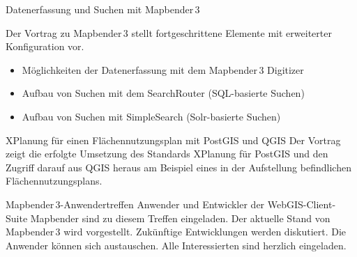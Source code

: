 %
{Datenerfassung und Suchen mit Mapbender\,3}%
{}%
{Der Vortrag zu Mapbender\,3 stellt fortgeschrittene Elemente mit erweiterter Konfiguration vor. 
\begin{itemize}
\RaggedRight
\setlength{\itemsep}{-2pt} %
 \item Möglichkeiten der Datenerfassung mit dem Mapbender\,3 Digitizer
 \item Aufbau von Suchen mit dem SearchRouter (SQL-basierte Suchen)
 \item Aufbau von Suchen mit SimpleSearch (Solr-basierte Suchen)
\end{itemize}
\justifying%
}

%
{XPlanung für einen Flächennutzungsplan mit PostGIS und QGIS}%
{}%
{Der Vortrag zeigt die erfolgte Umsetzung des Standards XPlanung für PostGIS und den Zugriff darauf aus
QGIS heraus am Beispiel eines in der Aufstellung befindlichen Flächennutzungsplans. }

\label{bof-dienstag}
%
{Mapbender\,3-Anwendertreffen}%
{}%
{Anwender und Entwickler der WebGIS-Client-Suite Mapbender sind zu diesem Treffen
eingeladen. Der aktuelle Stand von Mapbender\,3 wird vorgestellt.
Zukünftige Entwicklungen werden diskutiert. Die Anwender können sich austauschen.
Alle Interessierten sind herzlich eingeladen.}
